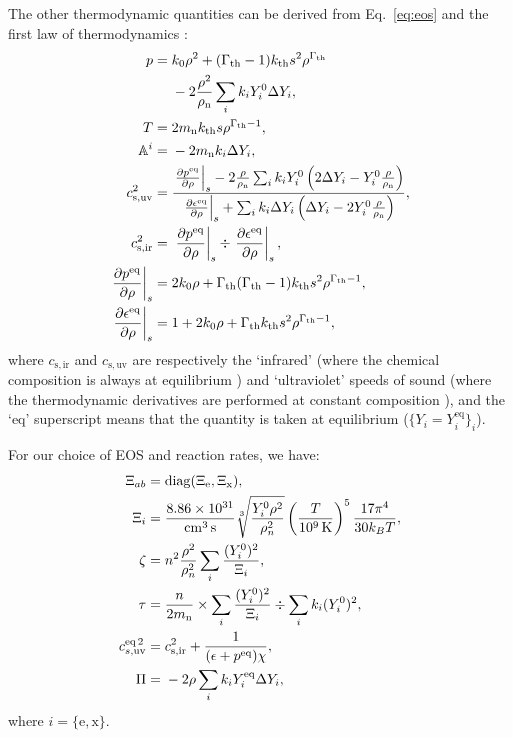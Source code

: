 \documentclass[aps,prd,twocolumn,a4paper,floatfix,nofootbib,superscriptaddress,nofootinbib]{revtex4}
\newcommand{\rth}{\mathrm{th}}
\newcommand{\re}{\mathrm{e}}
\newcommand{\rn}{\mathrm{n}}
\newcommand{\req}{\mathrm{eq}}
\newcommand{\rx}{\mathrm{x}}
\begin{document}
The other thermodynamic quantities can be derived from Eq.~\eqref{eq:eos}
and the first law of thermodynamics \cite{Camelio22a}:
%
\begin{align}
p={}&k_0\rho^2+ (\Gamma_\rth-1)k_\rth s^2\rho^{\Gamma_\rth} \notag\\
&{}- 2\frac{\rho^2}{\rho_\rn}\sum_i k_i Y_i^0 \Delta Y_i,\\
T={}& 2m_\rn k_\rth s \rho^{\Gamma_\rth-1},\\
\label{eq:ai-dyi}
\mathbb A^i={}&{}-2m_\rn k_i\Delta Y_i,\\
\label{eq:cs-uv}
c_\mathrm{s,uv}^2={}&\frac{\left.\frac{\partial p^\req}{\partial\rho}\right|_s
-2\frac{\rho}{\rho_\rn}\sum_ik_iY_i^0\left(2\Delta Y_i- Y_i^0\frac{\rho}{\rho_\rn}\right)}
{\left.\frac{\partial\epsilon^\req}{\partial\rho}\right|_s
+\sum_i k_i \Delta Y_i\left(\Delta Y_i - 2 Y_i^0 \frac{\rho}{\rho_\rn}\right)},\\
c_\mathrm{s,ir}^2={}&\left.\frac{\partial p^\req}{\partial\rho}\right|_s\div
\left.\frac{\partial\epsilon^\req}{\partial\rho}\right|_s,\\
\left.\frac{\partial p^\req}{\partial\rho}\right|_s={}&{}2k_0\rho+\Gamma_\rth(\Gamma_\rth-1)k_\rth s^2\rho^{\Gamma_\rth-1},\\
\left.\frac{\partial\epsilon^\req}{\partial\rho}\right|_s={}&{}1+2k_0\rho+\Gamma_\rth k_\rth s^2\rho^{\Gamma_\rth-1},
\end{align}
%
where $c_\mathrm{s,ir}$ and
$c_\mathrm{s,uv}$ are respectively the `infrared' (where the chemical composition is always at equilibrium \cite{Camelio22a}) and `ultraviolet' speeds of
sound \cite{Camelio22a} (where the thermodynamic derivatives are performed at constant composition \cite{Camelio22a}), and the `eq' superscript means that the quantity is
taken at equilibrium ($\{Y_i=Y_i^\req\}_i$).

For our choice of EOS and reaction rates, we have:
%
\begin{align}
\Xi_{ab}={}& \mathrm{diag}(\Xi_\re,\Xi_\rx),\\
\Xi_i={}& \frac{8.86\times10^{31}}{\unit{cm^{3}\,s}}\sqrt[3]{\frac{Y^0_i\rho^2}{\rho^2_n}}
\left(\frac{T}{\unit[10^9]{K}}\right)^5
\frac{17\pi^4}{30k_BT},\\
\zeta={}&n^2\frac{\rho^2}{\rho_n^2}\sum_i\frac{(Y^0_i)^2}{\Xi_i},\\
\tau={}&\frac{n}{2m_\rn}\times\sum_i{\frac{(Y_i^0)^2}{\Xi_i}}\div\sum_i{k_i(Y_i^0)^2},\\
\label{eq:effective-cs2}
c_{s,\mathrm{uv}}^{\req \, 2}={}& c_\mathrm{s,ir}^2 + \frac{1}{(\epsilon+p^\req)\chi},\\
\Pi={}&-2\rho\sum_i k_i Y^\req_i \Delta Y_i,
\end{align}
%
where $i=\{\re,\rx\}$.
\end{document}
